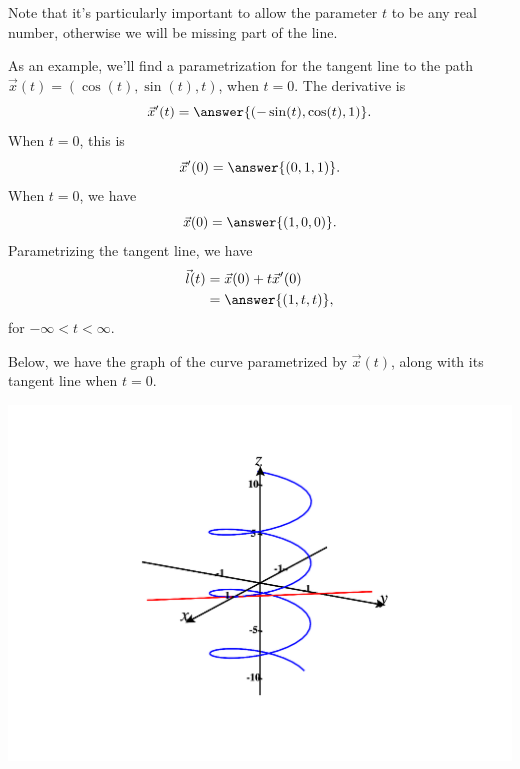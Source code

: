 \documentclass{ximera}
\begin{document}
Note that it's particularly important to allow the parameter $t$ to be any real number, otherwise we will be missing part of the line.

\begin{example}
As an example, we'll find a parametrization for the tangent line to the path $\vec{x}(t)=(\cos(t),\sin(t),t)$, when $t=0$. The derivative is
\[
\vec{x}'(t) = \answer{(-\sin(t),\cos(t),1)}.
\]
When $t=0$, this is
\[
\vec{x}'(0) = \answer{(0,1,1)}.
\]
When $t=0$, we have
\[
\vec{x}(0) = \answer{(1,0,0)}.
\]
Parametrizing the tangent line, we have
\begin{align*}
\vec{l}(t) &= \vec{x}(0) + t\vec{x}'(0)\\
&= \answer{(1,t,t)},
\end{align*}
for $-\infty < t < \infty$.

Below, we have the graph of the curve parametrized by $\vec{x}(t)$, along with its tangent line when $t=0$.

\begin{image}
\includegraphics[width=\textwidth]{CalcPlot3D-tangent_line}
\end{image}
\end{example}
\end{document}
